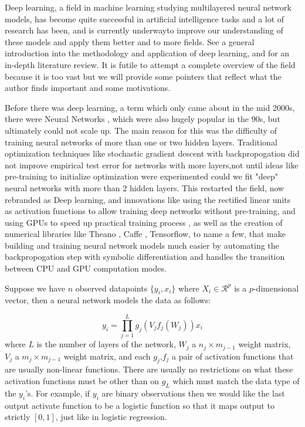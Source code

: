 \documentclass{book}
\begin{document}
\begin{enumerate}
Deep learning, a field in machine learning studying multilayered neural network models, has become quite successful in artificial intelligence tasks and a lot of research has been, and is currently underwayto improve our understanding of these models and apply them better and to more fields. See \cite{Goodfellow-et-al-2016-Book,lecun2015deep} a general introduction into the methodology and application of deep learning, and \cite{schmidhuber2015deep} for an in-depth literature review. It is futile to attempt a complete overview of the field because it is too vast but we will provide some pointers that reflect what the author finds important and some motivations. 

Before there was deep learning, a term which only came about in the mid 2000s, there were Neural Networks \cite{bishop1995neural,ripley2007pattern}, which were also hugely popular in the 90s, but ultimately could not scale up. The main reason for this was the difficulty of training neural networks of more than one or two hidden layers. Traditional optimization techniques like stochastic gradient descent with backpropogation did not improve empirical test error for networks with more layers,not until ideas like pre-training to initialize optimization were experimented could we fit "deep" neural networks with more than 2 hidden layers. This restarted the field, now rebranded as Deep learning, and innovations like using the rectified linear units as activation functions \cite{nair2010rectified} to allow training deep networks without pre-training, and using GPUs to speed up practical training process \cite{krizhevsky2012imagenet}, as well as the creation of numerical libraries like Theano \cite{bergstra2010theano}, Caffe \cite{jia2014caffe}, Tensorflow\cite{tensorflow2015-whitepaper}, to name a few, that make building and training neural network models much easier by automating the backpropogation step with symbolic differentiation \cite{bahrampour2015comparative} and handles the transition between CPU and GPU computation modes. 

Suppose we have $n$ observed datapoints $\{y_i,x_i\}$ where $X_i \in
\mathcal{R}^p$ is a $p$-dimensional vector, then a neural network models the
data as follows:

\[y_i = \prod_{j=1}^Lg_j(V_jf_j(W_j))x_i \]
where $L$ is the number of layers of the network, $W_j$ a $n_j \times m_{j-1}$
weight matrix, $V_j$ a $m_j \times m_{j-1}$ weight matrix, and each $g_j$,$f_j$
a pair of activation functions that are usually non-linear functions. There are
usually no restrictions on what these activation functions must be other than on
$g_L$ which must match the data type of the $y_i$'s. For example, if $y_i$ are
binary observations then we would like the last output activate function to be a
logistic function so that it maps output to strictly $[0,1]$, just like in
logistic regression.


\end{enumerate}
\end{document}
